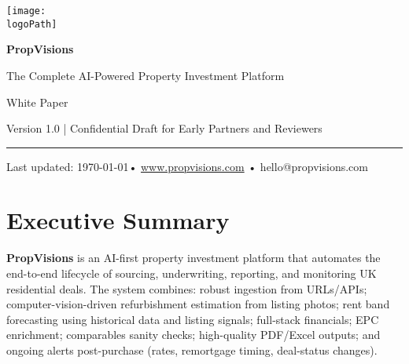 \documentclass[12pt,a4paper]{article}
\newcommand{\logoPath}{/Users/jamesquessy/Desktop/property-scout-ui/PropVisions_Logo.png}
\begin{document}
\begin{titlepage}
  \centering
  \vspace*{1.5cm}

  \texttt{[image: \\logoPath]}

  \vspace{2.5cm}
  {\fontsize{28}{30}\selectfont\bfseries PropVisions\par}
  \vspace{0.6em}
  {\Large The Complete AI-Powered Property Investment Platform\par}

  \vspace{2.5cm}
  {\large White Paper\par}
  \vspace{0.4em}
  {\normalsize Version 1.0 \quad | \quad Confidential Draft for Early Partners and Reviewers\par}

  \vfill
  \color{brandgray}
  \rule{\textwidth}{0.6pt}\par
  \vspace{0.6em}
  {\small Last updated: \today \quad • \quad \textcolor{brandblue}{\href{https://www.propvisions.com}{www.propvisions.com}} \quad • \quad hello@propvisions.com\par}
\end{titlepage}

\pagestyle{fancy}
\fancyhf{}
\setlength{\headheight}{20pt}
\renewcommand{\headrulewidth}{0pt}
\fancyfoot[C]{\thepage}

\setcounter{page}{1}

\tableofcontents
\newpage

\setcounter{page}{1}

\section{Executive Summary}
\textbf{PropVisions} is an AI-first property investment platform that automates the end-to-end lifecycle of sourcing, underwriting, reporting, and monitoring UK residential deals. The system combines: robust ingestion from URLs/APIs; computer-vision-driven refurbishment estimation from listing photos; rent band forecasting using historical data and listing signals; full-stack financials; EPC enrichment; comparables sanity checks; high-quality PDF/Excel outputs; and ongoing alerts post-purchase (rates, remortgage timing, deal-status changes).
\end{document}
